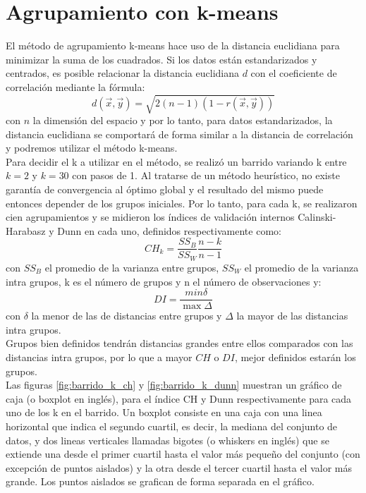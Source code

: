 \section{Agrupamiento con k-means}
El método de agrupamiento k-means hace uso de la distancia euclidiana para minimizar la suma de los cuadrados. Si los datos están estandarizados y centrados, es posible relacionar la distancia euclidiana $d$ con el coeficiente de correlación mediante la fórmula:
\begin{equation}
	d(\vec{x}, \vec{y}) = \sqrt{2(n-1)(1-r(\vec{x}, \vec{y}))}
\end{equation}
con $n$ la dimensión del espacio y por lo tanto, para datos estandarizados, la distancia euclidiana se comportará de forma similar a la distancia de correlación y podremos utilizar el método k-means.\\
Para decidir el k a utilizar en el método, se realizó un barrido variando k entre $k=2$ y $k=30$ con pasos de 1. Al tratarse de un método heurístico, no existe garantía de convergencia al óptimo global y el resultado del mismo puede entonces depender de los grupos iniciales. Por lo tanto, para cada k, se realizaron cien agrupamientos y se midieron los índices de validación internos Calinski-Harabasz y Dunn en cada uno, definidos respectivamente como:
\begin{equation}
	CH_k = \frac{SS_B}{SS_W}\frac{n-k}{n-1}
\end{equation}
con $SS_B$ el promedio de la varianza entre grupos, $SS_W$ el promedio de la varianza intra grupos, k es el número de grupos y n el número de observaciones y:
\begin{equation}
	DI = \frac{min\delta}{\max\Delta}
\end{equation}
con $\delta$ la menor de las de distancias entre grupos y $\Delta$ la mayor de las distancias intra grupos.\\
Grupos bien definidos tendrán distancias grandes entre ellos comparados con las distancias intra grupos, por lo que a mayor $CH$ o $DI$, mejor definidos estarán los grupos.\\
Las figuras \ref{fig:barrido_k_ch} y \ref{fig:barrido_k_dunn} muestran un gráfico de caja (o boxplot en inglés), para el índice CH y Dunn respectivamente para cada uno de los k en el barrido. Un boxplot consiste en una caja con una linea horizontal que indica el segundo cuartil, es decir, la mediana del conjunto de datos, y dos lineas verticales llamadas bigotes (o whiskers en inglés) que se extiende una desde el primer cuartil hasta el valor más pequeño del conjunto (con excepción de puntos aislados) y la otra desde el tercer cuartil hasta el valor más grande. Los puntos aislados se grafican de forma separada en el gráfico.
